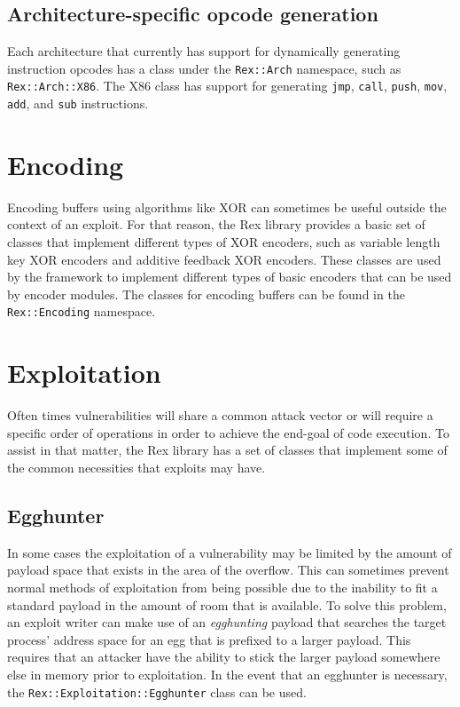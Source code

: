 \documentclass{report}
\begin{document}
        \subsection{Architecture-specific opcode generation}

\par
Each architecture that currently has support for dynamically
generating instruction opcodes has a class under the
\texttt{Rex::Arch} namespace, such as \texttt{Rex::Arch::X86}.  The
X86 class has support for generating \texttt{jmp}, \texttt{call},
\texttt{push}, \texttt{mov}, \texttt{add}, and \texttt{sub}
instructions.

    \section{Encoding}

\par
Encoding buffers using algorithms like XOR can sometimes be useful
outside the context of an exploit.  For that reason, the Rex library
provides a basic set of classes that implement different types of
XOR encoders, such as variable length key XOR encoders and additive
feedback XOR encoders.  These classes are used by the framework to
implement different types of basic encoders that can be used by
encoder modules.  The classes for encoding buffers can be found in
the \texttt{Rex::Encoding} namespace.

    \section{Exploitation}

\par
Often times vulnerabilities will share a common attack vector or
will require a specific order of operations in order to achieve the
end-goal of code execution.  To assist in that matter, the Rex
library has a set of classes that implement some of the common
necessities that exploits may have.

        \subsection{Egghunter}

\par
In some cases the exploitation of a vulnerability may be limited by
the amount of payload space that exists in the area of the overflow.
This can sometimes prevent normal methods of exploitation from being
possible due to the inability to fit a standard payload in the
amount of room that is available.  To solve this problem, an exploit
writer can make use of an \textit{egghunting} payload that searches
the target process' address space for an egg that is prefixed to a
larger payload.  This requires that an attacker have the ability to
stick the larger payload somewhere else in memory prior to
exploitation.  In the event that an egghunter is necessary, the
\texttt{Rex::Exploitation::Egghunter} class can be used.
\end{document}
